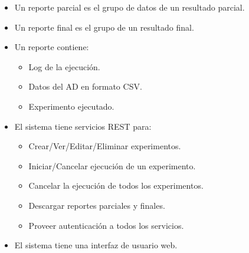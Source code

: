 \begin{itemize}
\item Un reporte parcial es el grupo de datos de un resultado parcial.
\item Un reporte final es el grupo de un resultado final.
\item Un reporte contiene:
    \begin{itemize}
    \item Log de la ejecuci\'on.
    \item Datos del AD en formato CSV.
    \item Experimento ejecutado.
    \end{itemize}
\end{itemize}
\begin{itemize}
\item El sistema tiene servicios REST para:
    \begin{itemize}
    \item Crear/Ver/Editar/Eliminar experimentos.
    \item Iniciar/Cancelar ejecuci\'on de un experimento.
    \item Cancelar la ejecuci\'on de todos los experimentos.
    \item Descargar reportes parciales y finales.
    \item Proveer autenticaci\'on a todos los servicios.
    \end{itemize}
\end{itemize}
\begin{itemize}
\item El sistema tiene una interfaz de usuario web.
\end{itemize}
\newpage